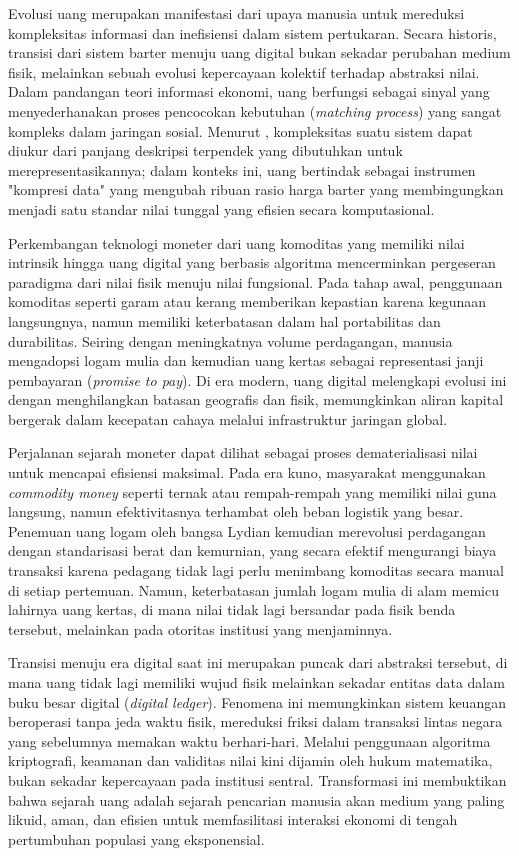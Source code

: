 Evolusi uang merupakan manifestasi dari upaya manusia untuk mereduksi kompleksitas informasi dan inefisiensi dalam sistem pertukaran. Secara historis, transisi dari sistem barter menuju uang digital bukan sekadar perubahan medium fisik, melainkan sebuah evolusi kepercayaan kolektif terhadap abstraksi nilai. Dalam pandangan teori informasi ekonomi, uang berfungsi sebagai sinyal yang menyederhanakan proses pencocokan kebutuhan (\textit{matching process}) yang sangat kompleks dalam jaringan sosial. Menurut \cite{kolmogorov_1968}, kompleksitas suatu sistem dapat diukur dari panjang deskripsi terpendek yang dibutuhkan untuk merepresentasikannya; dalam konteks ini, uang bertindak sebagai instrumen "kompresi data" yang mengubah ribuan rasio harga barter yang membingungkan menjadi satu standar nilai tunggal yang efisien secara komputasional.

Perkembangan teknologi moneter dari uang komoditas yang memiliki nilai intrinsik hingga uang digital yang berbasis algoritma mencerminkan pergeseran paradigma dari nilai fisik menuju nilai fungsional. Pada tahap awal, penggunaan komoditas seperti garam atau kerang memberikan kepastian karena kegunaan langsungnya, namun memiliki keterbatasan dalam hal portabilitas dan durabilitas. Seiring dengan meningkatnya volume perdagangan, manusia mengadopsi logam mulia dan kemudian uang kertas sebagai representasi janji pembayaran (\textit{promise to pay}). Di era modern, uang digital melengkapi evolusi ini dengan menghilangkan batasan geografis dan fisik, memungkinkan aliran kapital bergerak dalam kecepatan cahaya melalui infrastruktur jaringan global.

\begin{example}
    Perjalanan sejarah moneter dapat dilihat sebagai proses dematerialisasi nilai untuk mencapai efisiensi maksimal. Pada era kuno, masyarakat menggunakan \textit{commodity money} seperti ternak atau rempah-rempah yang memiliki nilai guna langsung, namun efektivitasnya terhambat oleh beban logistik yang besar. Penemuan uang logam oleh bangsa Lydian kemudian merevolusi perdagangan dengan standarisasi berat dan kemurnian, yang secara efektif mengurangi biaya transaksi karena pedagang tidak lagi perlu menimbang komoditas secara manual di setiap pertemuan. Namun, keterbatasan jumlah logam mulia di alam memicu lahirnya uang kertas, di mana nilai tidak lagi bersandar pada fisik benda tersebut, melainkan pada otoritas institusi yang menjaminnya.

    Transisi menuju era digital saat ini merupakan puncak dari abstraksi tersebut, di mana uang tidak lagi memiliki wujud fisik melainkan sekadar entitas data dalam buku besar digital (\textit{digital ledger}). Fenomena ini memungkinkan sistem keuangan beroperasi tanpa jeda waktu fisik, mereduksi friksi dalam transaksi lintas negara yang sebelumnya memakan waktu berhari-hari. Melalui penggunaan algoritma kriptografi, keamanan dan validitas nilai kini dijamin oleh hukum matematika, bukan sekadar kepercayaan pada institusi sentral. Transformasi ini membuktikan bahwa sejarah uang adalah sejarah pencarian manusia akan medium yang paling likuid, aman, dan efisien untuk memfasilitasi interaksi ekonomi di tengah pertumbuhan populasi yang eksponensial.
\end{example}

